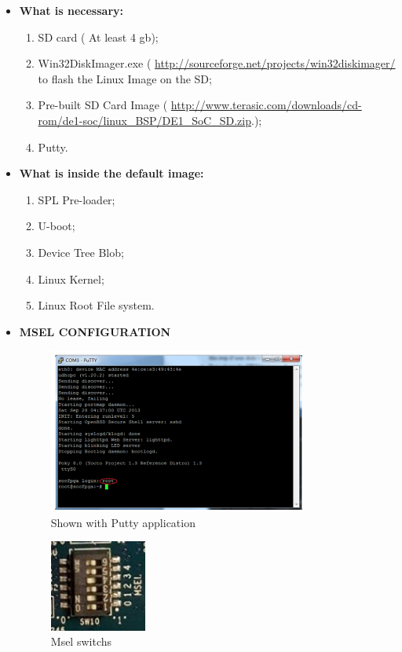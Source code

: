 \begin{itemize}
\item \textbf{What is necessary:}

\begin{enumerate}
\item SD card ( At least 4 gb);
\item Win32DiskImager.exe ( \url{http://sourceforge.net/projects/win32diskimager/} to flash the Linux Image on the SD; 
\item Pre-built SD Card Image ( \url{http://www.terasic.com/downloads/cd-rom/de1-soc/linux_BSP/DE1_SoC_SD.zip}.);
\item Putty.
\end{enumerate}

\item \textbf{What is inside the default image:}

\begin{enumerate}
\item SPL Pre-loader;
\item U-boot; 
\item Device Tree Blob;
\item Linux Kernel;
\item Linux Root File system.
\end{enumerate}

\item \textbf{MSEL CONFIGURATION}
\begin{figure}[h]
	\centering		\includegraphics[width=0.8\textwidth]{img/putty1}
	\caption{Shown with Putty application}
    	\label{fig:putty}
\end{figure}
\begin{figure}[h]
	\centering		\includegraphics[width=0.3\textwidth]{img/msel}
	\caption{Msel switchs}
    	\label{fig:msel}
\end{figure}
\end{itemize}

